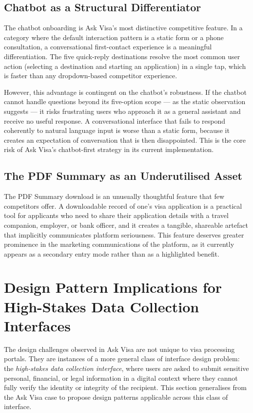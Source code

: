 \documentclass[journal, 10pt, twoside]{IEEEtran}
\begin{document}
\subsection{Chatbot as a Structural Differentiator}
The chatbot onboarding is Ask Visa's most distinctive competitive feature.
In a category where the default interaction pattern is a static form or a
phone consultation, a conversational first-contact experience is a meaningful
differentiation. The five quick-reply destinations resolve the most common
user action (selecting a destination and starting an application) in a single
tap, which is faster than any dropdown-based competitor experience.

However, this advantage is contingent on the chatbot's robustness. If
the chatbot cannot handle questions beyond its five-option scope ---
as the static observation suggests --- it risks frustrating users who
approach it as a general assistant and receive no useful response.
A conversational interface that fails to respond coherently to natural
language input is worse than a static form, because it creates an
expectation of conversation that is then disappointed. This is the
core risk of Ask Visa's chatbot-first strategy in its current implementation.

\subsection{The PDF Summary as an Underutilised Asset}
The PDF Summary download is an unusually thoughtful feature that few
competitors offer. A downloadable record of one's visa application is a
practical tool for applicants who need to share their application details
with a travel companion, employer, or bank officer, and it creates a
tangible, shareable artefact that implicitly communicates platform
seriousness. This feature deserves greater prominence in the marketing
communications of the platform, as it currently appears as a secondary
entry mode rather than as a highlighted benefit.

\section{Design Pattern Implications for High-Stakes Data Collection Interfaces}
\label{sec:design_patterns}

The design challenges observed in Ask Visa are not unique to visa
processing portals. They are instances of a more general class of
interface design problem: the \emph{high-stakes data collection interface},
where users are asked to submit sensitive personal, financial, or legal
information in a digital context where they cannot fully verify the identity
or integrity of the recipient. This section generalises from the Ask Visa
case to propose design patterns applicable across this class of interface.
\end{document}
